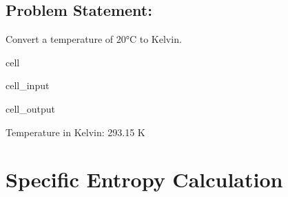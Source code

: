 \documentclass[letterpaper,10pt,english]{jupyterBook}
\begin{document}
\subsection{Problem Statement:}
\label{\detokenize{notebooks/Chapter2/Problem_7_Conversion_of_Temperature:problem-statement}}
\sphinxAtStartPar
Convert a temperature of 20°C to Kelvin.

\begin{sphinxuseclass}{cell}\begin{sphinxVerbatimInput}

\begin{sphinxuseclass}{cell_input}
\begin{sphinxVerbatim}[commandchars=\\\{\}]

    

    

\end{sphinxVerbatim}

\end{sphinxuseclass}\end{sphinxVerbatimInput}
\begin{sphinxVerbatimOutput}

\begin{sphinxuseclass}{cell_output}
\begin{sphinxVerbatim}[commandchars=\\\{\}]
Temperature in Kelvin: 293.15 K
\end{sphinxVerbatim}

\end{sphinxuseclass}\end{sphinxVerbatimOutput}

\end{sphinxuseclass}
\sphinxstepscope


\section{Specific Entropy Calculation}
\label{\detokenize{notebooks/Chapter2/Problem_8_Specific_Entropy_Calculation:specific-entropy-calculation}}\label{\detokenize{notebooks/Chapter2/Problem_8_Specific_Entropy_Calculation::doc}}
\end{document}
